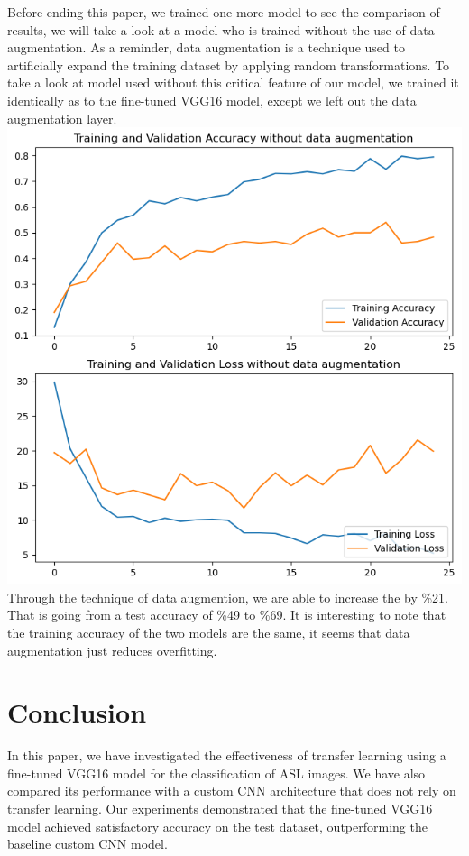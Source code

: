 \documentclass[12pt]{article}
\begin{document}
Before ending this paper, we trained one more model to see the comparison of results, we will take a look at a model who is trained without the use of data augmentation. As a reminder,
data augmentation is a technique used to artificially expand the training dataset by applying random transformations. To take a look at model used without this critical feature of our model, we trained it identically as 
to the fine-tuned VGG16 model, except we left out the data augmentation layer.\\
\includegraphics*[scale=0.5]{images/loss+acc no aug.png}\\
Through the technique of data augmention, we are able to increase the by \%21. That is going from a test accuracy of \%49 to \%69. It is interesting to note that the training accuracy of the two models are the same, it seems that data augmentation just reduces overfitting.

\section*{Conclusion}
In this paper, we have investigated the effectiveness of transfer learning using a fine-tuned VGG16 model for the classification of ASL images. We have also compared its performance with a custom CNN architecture that does not rely on transfer learning. Our experiments demonstrated that the fine-tuned VGG16 model achieved satisfactory accuracy on the test dataset, outperforming the baseline custom CNN model.\\
\end{document}
